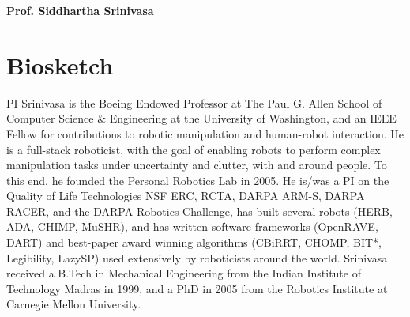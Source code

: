 \documentclass[10pt]{article}
\newcommand{\svn}[1]{\svnsub#1}
\def\svnsub$#1${#1}
\begin{document}
\pagestyle{empty} %

\par{\centering
		{\bf\LARGE Prof. Siddhartha Srinivasa
	}\bigskip\par}





\section{Biosketch}
\noindent PI Srinivasa is the Boeing Endowed Professor at The Paul G. Allen School of Computer Science \& Engineering at the University of Washington, and an IEEE Fellow for contributions to robotic manipulation and human-robot interaction. He is a full-stack roboticist, with the goal of enabling robots to perform complex manipulation tasks under uncertainty and clutter, with and around people. To this end, he founded the Personal Robotics Lab in 2005. He is/was a PI on the Quality of Life Technologies NSF ERC, RCTA, DARPA ARM-S, DARPA RACER, and the DARPA Robotics Challenge, has built several robots (HERB, ADA, CHIMP, MuSHR), and has written software frameworks (OpenRAVE, DART) and best-paper award winning algorithms (CBiRRT, CHOMP, BIT*, Legibility, LazySP) used extensively by roboticists around the world. Srinivasa received a B.Tech in Mechanical Engineering from the Indian Institute of Technology Madras in 1999, and a PhD in 2005 from the Robotics Institute at Carnegie Mellon University.



\end{document}
